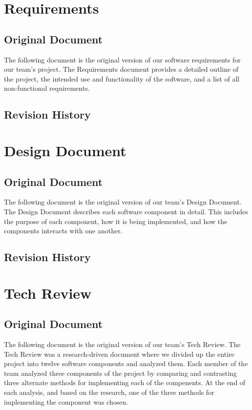 \documentclass[10pt,letterpaper,onecolumn,draftclsnofoot,journal]{IEEEtran}
\begin{document}
\section{\textbf{Requirements}}
\subsection{\textbf{Original Document}}
The following document is the original version of our software requirements for our team's project. The Requirements document provides a detailed outline of the project, the intended use and functionality of the software, and a list of all non-functional requirements.     


\subsection{\textbf{Revision History}}



\section{\textbf{Design Document}}
\subsection{\textbf{Original Document}}
The following document is the original version of our team's Design Document. The Design Document describes each software component in detail. This includes the purpose of each component, how it is being implemented, and how the components interacts with one another.    


\subsection{\textbf{Revision History}}



\section{\textbf{Tech Review}}
\subsection{\textbf{Original Document}}
The following document is the original version of our team's Tech Review. The Tech Review was a research-driven document where we divided up the entire project into twelve software components and analyzed them. Each member of the team analyzed three components of the project by comparing and contrasting three alternate methods for implementing each of the compenents. At the end of each analysis, and based on the research, one of the three methods for implementing the component was chosen. 

\end{document}
